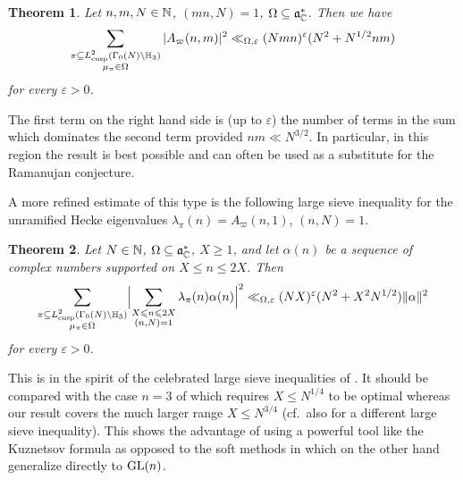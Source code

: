 \documentclass[11pt]{amsart}
\theoremstyle{plain}
\newtheorem{theorem}{Theorem}
\numberwithin{equation}{section}
\theoremstyle{definition}
\renewcommand{\geq}{\geqslant}
\renewcommand{\leq}{\leqslant}
\begin{document}
\begin{theorem}\label{thm2} Let $n, m, N \in \Bbb{N}$, $(mn, N) = 1$, $\Omega \subseteq \mathfrak{a}_{\Bbb{C}}^{\ast}$.  Then we have
$$  \sum_{\substack{\pi \subseteq L_{{\rm cusp}}^2(\Gamma_0(N) \backslash \Bbb{H}_3) \\ \mu_{\pi}\in \Omega}} | A_{\varpi}(n, m)|^2\ll_{\Omega, \varepsilon}  (Nmn)^{\varepsilon}(N^2 +  N^{1/2}nm)$$
for every $\varepsilon> 0$. 
 \end{theorem}

The first term on the right hand side is (up to $\varepsilon$) the number of terms in the sum which dominates the second term provided $nm \ll N^{3/2}$. In particular, in this region the result is best possible and can often be used as a substitute for the Ramanujan conjecture. 

A more refined estimate of this type is the following large sieve inequality for the unramified Hecke eigenvalues $\lambda_{\pi}(n) = A_{\varpi}(n, 1)$, $(n, N) = 1$. 

\begin{theorem}\label{thm3} Let $N \in \Bbb{N}$, $\Omega \subseteq \mathfrak{a}_{\Bbb{C}}^{\ast}$, $X \geq 1$, and let $\alpha(n)$ be a sequence of complex numbers supported on $X \leq n \leq 2X$. Then
$$\sum_{\substack{\pi \subseteq L_{\text{{\rm cusp}}}^2(\Gamma_0(N) \backslash \Bbb{H}_3) \\  \mu_{\pi}\in \Omega}}\Bigl| \sum_{\substack{X \leq n \leq 2X\\ (n, N) = 1}}\lambda_{\pi}(n) \alpha(n)\Bigr|^2\ll_{\Omega, \varepsilon}  (NX)^{\varepsilon} (N^2    +  X^2N^{1/2})\| \alpha \|^2$$
for every $\varepsilon > 0$. 
\end{theorem}

This is   in the spirit of the celebrated large sieve inequalities of \cite{DI}. It should be compared with the case $n=3$ of \cite{Ve} which requires $X  \leq N^{1/4}$ to be optimal whereas our result covers the much larger range $X \leq N^{3/4}$ (cf.\ also \cite{DK} for a different  large sieve inequality).  This shows the advantage of using a powerful tool like the Kuznetsov formula as opposed to the soft methods in \cite{Ve} which on the other hand generalize directly to ${\rm GL}(n)$. 

\end{document}
